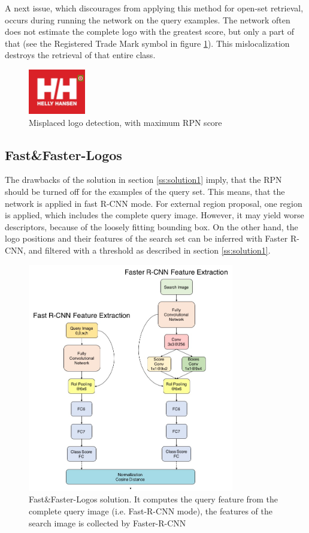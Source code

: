 A next issue, which discourages from applying this method for open-set retrieval, occurs during running the network on the query examples. The network often does not estimate the complete logo with the greatest score, but only a part of that (see the Registered Trade Mark symbol in figure \ref{f:missdet}). This mislocalization destroys the retrieval of that entire class.
\begin{figure}
  \centering
  \includegraphics[width=25mm]{images/mt/missdet.jpg}
  \caption{Misplaced logo detection, with maximum RPN score}
  \label{f:missdet}
\end{figure}
\subsection{Fast\&Faster-Logos}\label{ss:solution2}
The drawbacks of the solution in section \ref{ss:solution1} imply, that the RPN should be turned off for the examples of the query set. This means, that the network is applied in fast R-CNN mode. For external region proposal, one region is applied, which includes the complete query image. However, it may yield worse descriptors, because of the loosely fitting bounding box. On the other hand, the logo positions and their features of the search set can be inferred with Faster R-CNN, and filtered with a threshold as described in section \ref{ss:solution1}.
\begin{figure}
  \centering
  \includegraphics[width=90mm]{images/mt/sol2_arch.jpg}
  \caption{Fast\&Faster-Logos solution. It computes the query feature from the complete query image (i.e. Fast-R-CNN mode), the features of the search image is collected by Faster-R-CNN}
  \label{f:sol2arch}
\end{figure}
